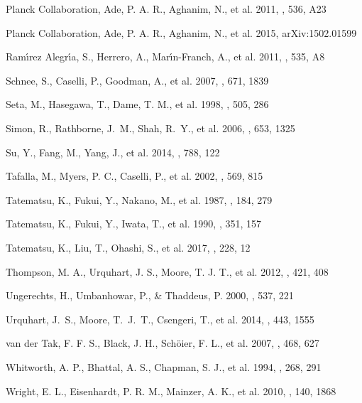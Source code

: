 \documentclass[manuscript]{aastex}
\begin{document}
\begin{thebibliography}{99}
Planck Collaboration, Ade, P. A. R., Aghanim, N., et al.
2011, \aap, 536, A23

Planck Collaboration, Ade, P. A. R., Aghanim, N., et al.
2015, arXiv:1502.01599

Ram{\'{\i}}rez Alegr{\'{\i}}a, S., Herrero, A., Mar{\'{\i}}n-Franch, A., et al.
2011, \aap, 535, A8

Schnee, S., Caselli, P., Goodman, A., et al.
2007, \apj, 671, 1839

Seta, M., Hasegawa, T., Dame, T. M., et al.
1998, \apj, 505, 286

Simon, R., Rathborne, J.~M., Shah, R.~Y., et al.
2006, \apj, 653, 1325

Su, Y., Fang, M., Yang, J., et al.
2014, \apj, 788, 122

Tafalla, M., Myers, P. C., Caselli, P., et al.
2002, \apj, 569, 815

Tatematsu, K., Fukui, Y., Nakano, M., et al.
1987, \aap, 184, 279

Tatematsu, K., Fukui, Y., Iwata, T., et al.
1990, \apj, 351, 157

Tatematsu, K., Liu, T., Ohashi, S., et al.
2017, \apjs, 228, 12

Thompson, M. A., Urquhart, J. S., Moore, T. J. T., et al.
2012, \mnras, 421, 408

Ungerechts, H., Umbanhowar, P., \& Thaddeus, P.
2000, \apj, 537, 221

Urquhart, J.~S., Moore, T.~J.~T., Csengeri, T., et al.
2014, \mnras, 443, 1555 

van der Tak, F. F. S., Black, J. H., Sch{\"o}ier, F. L., et al.
2007, \aap, 468, 627

Whitworth, A. P., Bhattal, A. S., Chapman, S. J., et al.
1994, \mnras, 268, 291


Wright, E. L., Eisenhardt, P. R. M., Mainzer, A. K., et al.
2010, \aj, 140, 1868



\end{thebibliography}
\end{document}
